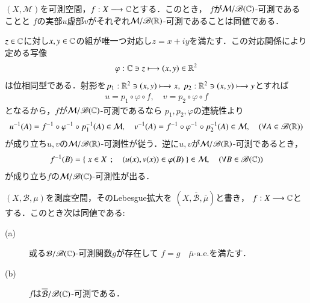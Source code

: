		\begin{screen}
			\begin{lem}[複素数値関数の可測性]\label{thm:measurability_of_complex_measurable_functions}
				$(X,\mathcal{M})$を可測空間，$f:X \longrightarrow \mathbb{C}$とする．このとき，
				$f$が$\mathcal{M}/\mathscr{B}(\mathbb{C})$-可測であることと
				$f$の実部$u$虚部$v$がそれぞれ$\mathcal{M}/\mathscr{B}(\mathbb{R})$-可測であることは同値である．
			\end{lem}
		\end{screen}
	
		\begin{prf}
			$z \in \mathbb{C}$に対し$x,y \in \mathbb{C}$の組が唯一つ対応し$z = x + i y$を満たす．この対応関係により定める写像
			\begin{align}
				\varphi:\mathbb{C} \ni z \longmapsto (x,y) \in \mathbb{R}^2
			\end{align}
			は位相同型である．射影を$p_1:\mathbb{R}^2 \ni (x,y) \longmapsto x,
			\ p_2:\mathbb{R}^2 \ni (x,y) \longmapsto y$とすれば
			\begin{align}
				u = p_1 \circ \varphi \circ f,
				\quad v = p_2 \circ \varphi \circ f
			\end{align}
			となるから，$f$が$\mathcal{M}/\mathscr{B}(\mathbb{C})$-可測であるなら
			$p_1,p_2,\varphi$の連続性より
			\begin{align}
				u^{-1}(A) = f^{-1} \circ \varphi^{-1} \circ p_1^{-1}(A) \in \mathcal{M},
				\quad v^{-1}(A) = f^{-1} \circ \varphi^{-1} \circ p_2^{-1}(A) \in \mathcal{M},
				\quad (\forall A \in \mathscr{B}(\mathbb{R}))
			\end{align}
			が成り立ち$u,v$の$\mathcal{M}/\mathscr{B}(\mathbb{R})$-可測性が従う．逆に$u,v$が$\mathcal{M}/\mathscr{B}(\mathbb{R})$-可測であるとき，
			\begin{align}
				f^{-1}(B) = \left\{\ x \in X\ \, ; \quad (u(x),v(x)) \in \varphi(B)\ \right\} \in \mathcal{M},
				\quad (\forall B \in \mathscr{B}(\mathbb{C}))
			\end{align}
			が成り立ち$f$の$\mathcal{M}/\mathscr{B}(\mathbb{C})$-可測性が出る．
			\QED
		\end{prf}
	
		\begin{screen}
			\begin{thm}
				$(X,\mathcal{B},\mu)$を測度空間，そのLebesgue拡大を
				$\left( X,\overline{\mathcal{B}},\overline{\mu} \right)$と書き，
				$f:X \longrightarrow \mathbb{C}$とする．このとき次は同値である:
				\begin{description}
					\item[(a)] 或る$\mathcal{B}/\mathscr{B}(\mathbb{C})$-可測関数$g$が存在して
						$f = g\quad \mbox{$\overline{\mu}$-a.e.}$を満たす．
					\item[(b)] $f$は$\overline{\mathcal{B}}/\mathscr{B}(\mathbb{C})$-可測である．
				\end{description}
			\end{thm}
		\end{screen}
		
